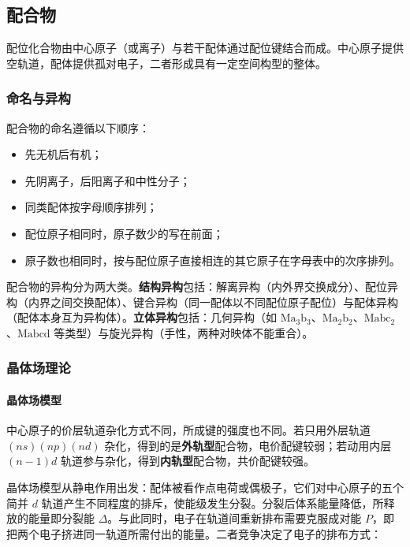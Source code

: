 \documentclass[UTF8]{ctexbook}
\begin{document}
\subsection{配合物}

配位化合物由中心原子（或离子）与若干配体通过配位键结合而成。中心原子提供空轨道，配体提供孤对电子，二者形成具有一定空间构型的整体。

\subsubsection{命名与异构}

配合物的命名遵循以下顺序：

\begin{itemize}
  \item 先无机后有机；
  \item 先阴离子，后阳离子和中性分子；
  \item 同类配体按字母顺序排列；
  \item 配位原子相同时，原子数少的写在前面；
  \item 原子数也相同时，按与配位原子直接相连的其它原子在字母表中的次序排列。
\end{itemize}

配合物的异构分为两大类。\textbf{结构异构}包括：解离异构（内外界交换成分）、配位异构（内界之间交换配体）、键合异构（同一配体以不同配位原子配位）与配体异构（配体本身互为异构体）。\textbf{立体异构}包括：几何异构（如 $\mathrm{Ma_3b_3}$、$\mathrm{Ma_2b_2}$、$\mathrm{Mabc_2}$、$\mathrm{Mabcd}$ 等类型）与旋光异构（手性，两种对映体不能重合）。

\subsubsection{晶体场理论}

\paragraph{晶体场模型}

中心原子的价层轨道杂化方式不同，所成键的强度也不同。若只用外层轨道 $(ns)(np)(nd)$ 杂化，得到的是\textbf{外轨型}配合物，电价配键较弱；若动用内层 $(n-1)d$ 轨道参与杂化，得到\textbf{内轨型}配合物，共价配键较强。

晶体场模型从静电作用出发：配体被看作点电荷或偶极子，它们对中心原子的五个简并 $d$ 轨道产生不同程度的排斥，使能级发生分裂。分裂后体系能量降低，所释放的能量即分裂能 $\Delta$。与此同时，电子在轨道间重新排布需要克服成对能 $P$，即把两个电子挤进同一轨道所需付出的能量。二者竞争决定了电子的排布方式：
\end{document}
